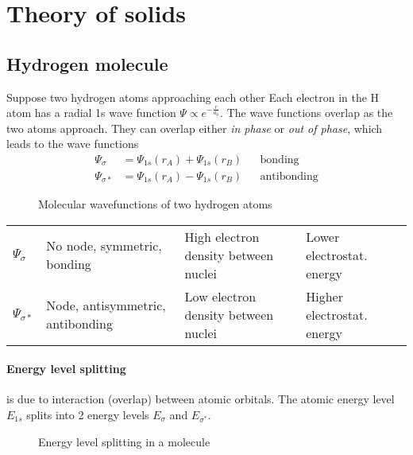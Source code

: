 \section{Theory of solids}

\subsection{Hydrogen molecule}
Suppose two hydrogen atoms approaching each other
Each electron in the H atom has a radial 1s wave function $\varPsi \propto e^{-\frac{r}{a_0}}$.
The wave functions overlap as the two atoms approach.
They can overlap either \emph{in phase} or \emph{out of phase}, which leads to the wave functions
\begin{align}
    \varPsi_{\sigma} &= \varPsi_{1s}(r_A) + \varPsi_{1s}(r_B) && \text{bonding} \\
    \varPsi_{\sigma *} &= \varPsi_{1s}(r_A) - \varPsi_{1s}(r_B) && \text{antibonding}
\end{align}

\begin{figure}[ht!]
    \centering
    
    \caption{Molecular wavefunctions of two hydrogen atoms}
\end{figure}

\begin{table}[ht!]
    \centering
    \begin{tabularx}{0.8\linewidth}{lXXX}
    \toprule
    $\varPsi_{\sigma}$ & No node, symmetric, bonding & High electron density between nuclei & Lower electrostat. energy \\
    $\varPsi_{\sigma *}$ & Node, antisymmetric, antibonding & Low electron density between nuclei & Higher electrostat. energy \\ 
    \bottomrule
    \end{tabularx}
\end{table}

\paragraph{Energy level splitting} 
is due to interaction (overlap) between atomic orbitals.
The atomic energy level $E_{1s}$ splits into 2 energy levels $E_{\sigma}$ and $E_{\sigma^*}$.

\begin{figure}[ht!]
    \centering
    
    \caption{Energy level splitting in a  molecule}
\end{figure}


